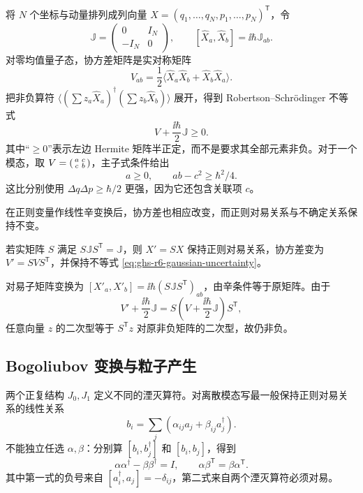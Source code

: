 将 $N$ 个坐标与动量排列成列向量 $X=(q_1,\ldots,q_N,p_1,\ldots,p_N)^{\mathsf T}$，令
\[
\mathbb J=\begin{pmatrix}0&I_N\\-I_N&0\end{pmatrix},
\qquad [\widehat X_a,\widehat X_b]=\ii\hbar\mathbb J_{ab}.
\]
对零均值量子态，协方差矩阵是实对称矩阵
\begin{equation}\label{eq:ghs-r6-covariance}
V_{ab}=\frac12\langle\widehat X_a\widehat X_b+
\widehat X_b\widehat X_a\rangle.
\end{equation}
把非负算符 $\langle(\sum z_a\widehat X_a)^\dagger(\sum z_b\widehat X_b)\rangle$ 展开，得到 Robertson--Schrödinger 不等式
\begin{equation}\label{eq:ghs-r6-gaussian-uncertainty}
V+\frac{\ii\hbar}{2}\mathbb J\ge0.
\end{equation}
其中“$\ge0$”表示左边 Hermite 矩阵半正定，而不是要求其全部元素非负。对于一个模态，取 $V=\begin{psmallmatrix}a&c\\c&b\end{psmallmatrix}$，主子式条件给出
\[
a\ge0,\qquad ab-c^2\ge\hbar^2/4.
\]
这比分别使用 $\Delta q\Delta p\ge\hbar/2$ 更强，因为它还包含关联项 $c$。



在正则变量作线性辛变换后，协方差也相应改变，而正则对易关系与不确定关系保持不变。

若实矩阵 $S$ 满足 $S\mathbb J S^{\mathsf T}=\mathbb J$，则 $X'=SX$ 保持正则对易关系，协方差变为 $V'=SVS^{\mathsf T}$，并保持不等式 \cref{eq:ghs-r6-gaussian-uncertainty}。

对易子矩阵变换为 $[X'_a,X'_b]=\ii\hbar(S\mathbb JS^{\mathsf T})_{ab}$，由辛条件等于原矩阵。由于
\[
V'+\frac{\ii\hbar}2\mathbb J
=S\left(V+\frac{\ii\hbar}2\mathbb J\right)S^{\mathsf T},
\]
任意向量 $z$ 的二次型等于 $S^{\mathsf T}z$ 对原非负矩阵的二次型，故仍非负。




\subsection{Bogoliubov 变换与粒子产生}

两个正复结构 $J_0,J_1$ 定义不同的湮灭算符。对离散模态写最一般保持正则对易关系的线性关系
\begin{equation}\label{eq:ghs-r6-bogoliubov-matrix}
b_i=\sum_j\left(\alpha_{ij}a_j+\beta_{ij}a_j^\dagger\right).
\end{equation}
不能独立任选 $\alpha,\beta$：分别算 $[b_i,b_j^\dagger]$ 和 $[b_i,b_j]$，得到
\begin{equation}\label{eq:ghs-r6-bogoliubov-identities}
\alpha\alpha^\dagger-\beta\beta^\dagger=I,
\qquad \alpha\beta^{\mathsf T}=\beta\alpha^{\mathsf T}.
\end{equation}
其中第一式的负号来自 $[a_i^\dagger,a_j]=-\delta_{ij}$，第二式来自两个湮灭算符必须对易。

